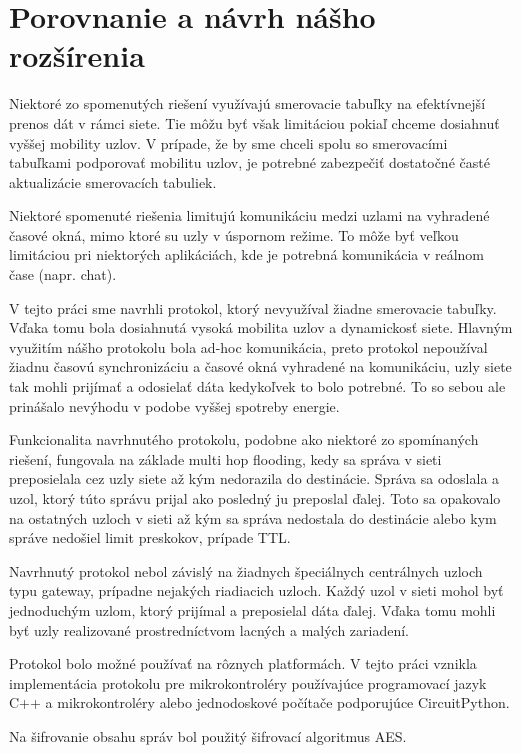 \documentclass[slovak,master]{diploma}
\begin{document}
\section{Porovnanie a návrh nášho rozšírenia}
Niektoré zo spomenutých riešení využívajú smerovacie tabuľky na efektívnejší prenos dát v rámci siete. Tie môžu byť však limitáciou pokiaľ 
chceme dosiahnuť vyššej mobility uzlov. V prípade, že by sme chceli spolu so smerovacími tabuľkami podporovať mobilitu uzlov, je potrebné zabezpečiť 
dostatočné časté aktualizácie smerovacích tabuliek.

Niektoré spomenuté riešenia limitujú komunikáciu medzi uzlami na vyhradené časové okná, mimo ktoré su uzly v úspornom režime. To môže byť 
veľkou limitáciou pri niektorých aplikáciách, kde je potrebná komunikácia v reálnom čase  (napr. chat).

V tejto práci sme navrhli protokol, ktorý nevyužíval žiadne smerovacie tabuľky. Vďaka tomu bola dosiahnutá vysoká mobilita uzlov a dynamickosť siete. 
Hlavným využitím nášho protokolu bola ad-hoc komunikácia, preto protokol nepoužíval 
žiadnu časovú synchronizáciu a časové okná vyhradené na komunikáciu, uzly siete tak mohli prijímať a odosielať dáta kedykoľvek to bolo potrebné.
To so sebou ale prinášalo nevýhodu v podobe vyššej spotreby energie.

Funkcionalita navrhnutého protokolu, podobne ako niektoré zo spomínaných riešení, fungovala na základe multi hop flooding, 
kedy sa správa v sieti preposielala cez uzly siete až kým nedorazila do destinácie.
Správa sa odoslala a uzol, ktorý túto správu prijal ako posledný ju preposlal ďalej. Toto sa opakovalo na ostatných uzloch v sieti až kým sa správa nedostala do destinácie alebo kym správe nedošiel limit preskokov, prípade TTL.

Navrhnutý protokol nebol závislý na žiadnych špeciálnych centrálnych uzloch typu gateway, prípadne nejakých riadiacich uzloch. Každý uzol v sieti mohol byť jednoduchým uzlom, ktorý prijímal a preposielal dáta ďalej.
Vďaka tomu mohli byť uzly realizované prostredníctvom lacných a malých zariadení.

Protokol bolo možné používať na rôznych platformách. V tejto práci vznikla implementácia protokolu pre mikrokontroléry používajúce programovací jazyk C++ a 
mikrokontroléry alebo jednodoskové počítače podporujúce CircuitPython.

Na šifrovanie obsahu správ bol použitý šifrovací algoritmus AES.
\end{document}
